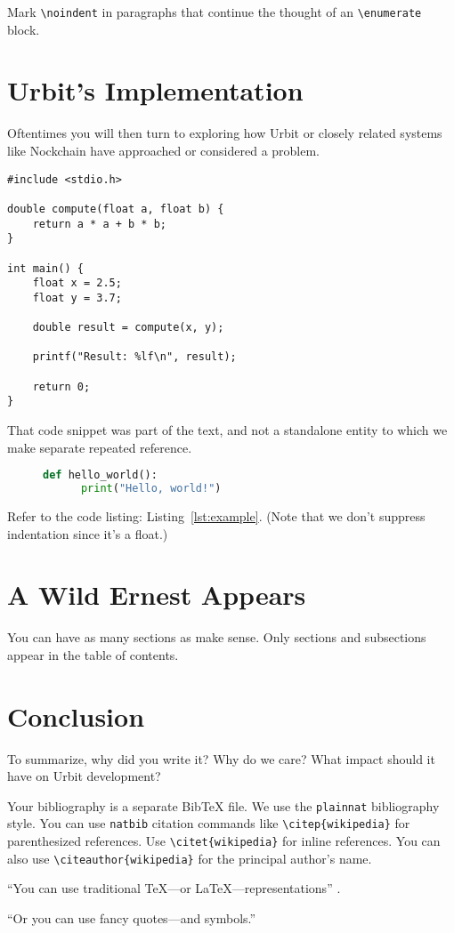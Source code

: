 \documentclass[twoside]{article}
\begin{document}
\noindent
Mark \texttt{\textbackslash noindent} in paragraphs that continue the thought of an \texttt{\textbackslash enumerate} block.

\section{Urbit's Implementation}

Oftentimes you will then turn to exploring how Urbit or closely related systems like Nockchain have approached or considered a problem.

\lstset{language=C}
\begin{lstlisting}
#include <stdio.h>

double compute(float a, float b) {
    return a * a + b * b;
}

int main() {
    float x = 2.5;
    float y = 3.7;

    double result = compute(x, y);

    printf("Result: %lf\n", result);

    return 0;
}
\end{lstlisting}

\noindent
That code snippet was part of the text, and not a standalone entity to which we make separate repeated reference.

\begin{figure}
  \begin{lstlisting}[language=Python, caption={Example Python Code}, label={lst:example}]
  def hello_world():
      print("Hello, world!")
  \end{lstlisting}
\end{figure}

Refer to the code listing: Listing~\ref{lst:example}.  (Note that we don't suppress indentation since it's a float.)


\section{A Wild Ernest Appears}

You can have as many sections as make sense.  Only sections and subsections appear in the table of contents.

\section{Conclusion}

To summarize, why did you write it?  Why do we care?  What impact should it have on Urbit development?

Your bibliography is a separate BibTeX file.  We use the \texttt{plainnat} bibliography style.  You can use \texttt{natbib} citation commands like \texttt{\textbackslash citep\{wikipedia\}} for parenthesized references.  Use \texttt{\textbackslash citet\{wikipedia\}} for inline references.  You can also use \texttt{\textbackslash citeauthor\{wikipedia\}} for the principal author's name.

``You can use traditional TeX---or LaTeX---representations'' \citep{Varney1987}.

“Or you can use fancy quotes—and symbols.”



\end{document}
